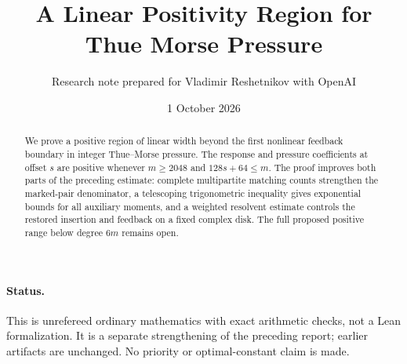 \documentclass[11pt,a4paper]{article}
\title{A Linear Positivity Region for Thue Morse Pressure}
\author{Research note prepared for Vladimir Reshetnikov with OpenAI}\date{1 October 2026}
\theoremstyle{remark}\newtheorem*{ednote}{Editorial note (ProveIt, 2026-10-01)}
\begin{document}
\maketitle
\begin{abstract}
We prove a positive region of linear width beyond the first nonlinear feedback boundary in integer Thue--Morse pressure. The response and pressure coefficients at offset $s$ are positive whenever $m\ge2048$ and $128s+64\le m$. The proof improves both parts of the preceding estimate: complete multipartite matching counts strengthen the marked-pair denominator, a telescoping trigonometric inequality gives exponential bounds for all auxiliary moments, and a weighted resolvent estimate controls the restored insertion and feedback on a fixed complex disk. The full proposed positive range below degree $6m$ remains open.
\end{abstract}
\paragraph{Status.} This is unrefereed ordinary mathematics with exact arithmetic checks, not a Lean formalization. It is a separate strengthening of the preceding report; earlier artifacts are unchanged. No priority or optimal-constant claim is made.
\end{document}
